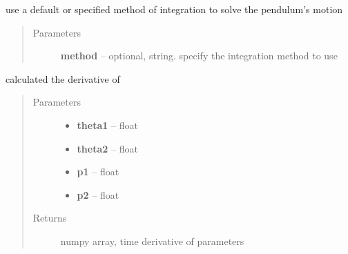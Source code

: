 \documentclass[letterpaper,10pt,english]{sphinxmanual}
\begin{document}

\begin{fulllineitems}
\label{index:doublePendulum.calculate_paths}
use a default or specified method of integration to solve the
pendulum's motion
\begin{quote}\begin{description}
\item[{Parameters}] \leavevmode
\textbf{method} -- optional, string.  specify the integration method to use

\end{description}\end{quote}

\end{fulllineitems}


\begin{fulllineitems}
\label{index:doublePendulum.deriv}
calculated the derivative of 
\begin{quote}\begin{description}
\item[{Parameters}] \leavevmode\begin{itemize}
\item {} 
\textbf{theta1} -- float

\item {} 
\textbf{theta2} -- float

\item {} 
\textbf{p1} -- float

\item {} 
\textbf{p2} -- float

\end{itemize}

\item[{Returns}] \leavevmode
numpy array, time derivative of parameters

\end{description}\end{quote}

\end{fulllineitems}

\end{document}

